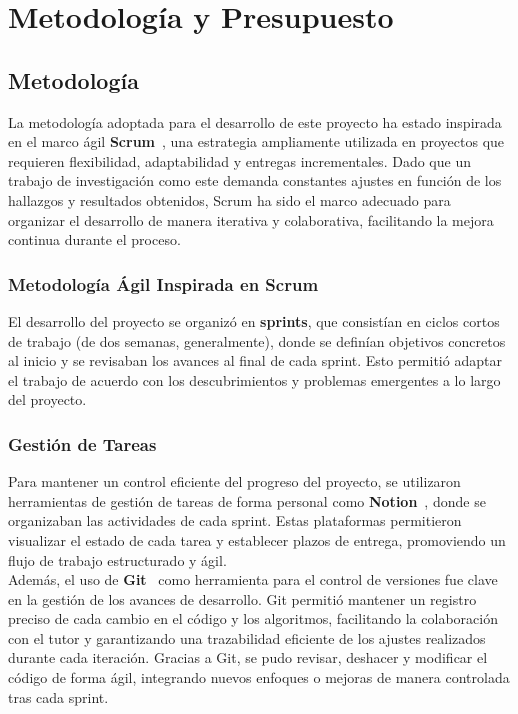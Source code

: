 \chapter{Metodología y Presupuesto}\label{ch:metodologia-y-presupuesto}
\section{Metodología}\label{sec:metodologia}
La metodología adoptada para el desarrollo de este proyecto ha estado inspirada en el marco ágil
\textbf{Scrum}~\cite{noauthor_scrum_nodate}, una estrategia ampliamente utilizada en proyectos que requieren
flexibilidad, adaptabilidad y entregas incrementales.
Dado que un trabajo de investigación como este demanda constantes ajustes en función de los hallazgos y resultados
obtenidos, Scrum ha sido el marco adecuado para organizar el desarrollo de manera iterativa y colaborativa, facilitando
la mejora continua durante el proceso.

\subsection{Metodología Ágil Inspirada en Scrum}\label{subsec:metodologia-agil-inspirada-en-scrum}
El desarrollo del proyecto se organizó en \textbf{sprints}, que consistían en ciclos cortos de
trabajo (de dos semanas, generalmente), donde se definían objetivos concretos al inicio y se revisaban los avances al
final de cada sprint.
Esto permitió adaptar el trabajo de acuerdo con los descubrimientos y problemas emergentes a lo largo del proyecto.

\subsection{Gestión de Tareas}
\label{subsec:gestion-de-tareas}
Para mantener un control eficiente del progreso del proyecto, se utilizaron herramientas de gestión de tareas de forma
personal como \textbf{Notion}~\cite{noauthor_notion_nodate}, donde se organizaban las actividades de cada sprint.
Estas plataformas permitieron visualizar el estado de cada tarea y establecer plazos de entrega, promoviendo un flujo
de trabajo estructurado y ágil.\\[6pt]

Además, el uso de \textbf{Git}~\cite{chacon_pro_2014} como herramienta para el control de versiones fue clave en la
gestión de los avances de desarrollo.
Git permitió mantener un registro preciso de cada cambio en el código y los algoritmos, facilitando la colaboración con
el tutor y garantizando una trazabilidad eficiente de los ajustes realizados durante cada iteración.
Gracias a Git, se pudo revisar, deshacer y modificar el código de forma ágil, integrando nuevos enfoques o mejoras de
manera controlada tras cada sprint.\\[6pt]

